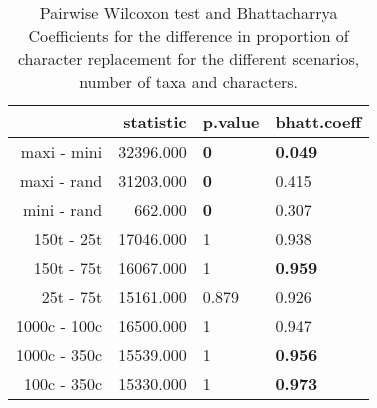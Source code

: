 \begin{table}[ht]
\centering
\begin{tabular}{rrll}
  \hline
 & statistic & p.value & bhatt.coeff \\ 
  \hline
maxi - mini & 32396.000 & \textbf{0} & \textbf{0.049} \\ 
  maxi - rand & 31203.000 & \textbf{0} & 0.415 \\ 
  mini - rand & 662.000 & \textbf{0} & 0.307 \\ 
  150t - 25t & 17046.000 & 1 & 0.938 \\ 
  150t - 75t & 16067.000 & 1 & \textbf{0.959} \\ 
  25t - 75t & 15161.000 & 0.879 & 0.926 \\ 
  1000c - 100c & 16500.000 & 1 & 0.947 \\ 
  1000c - 350c & 15539.000 & 1 & \textbf{0.956} \\ 
  100c - 350c & 15330.000 & 1 & \textbf{0.973} \\ 
   \hline
\end{tabular}
\caption{Pairwise Wilcoxon test and Bhattacharrya Coefficients for the difference in proportion of character replacement for the different scenarios, number of taxa and characters.} 
\label{Tab_proportion_replacement}
\end{table}

